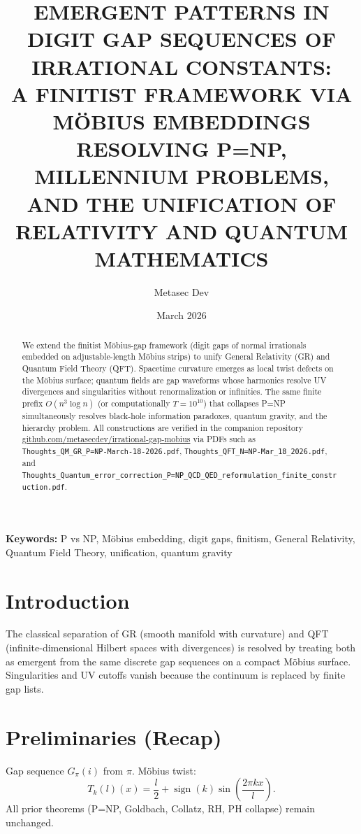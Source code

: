 \documentclass[11pt]{article}
\title{EMERGENT PATTERNS IN DIGIT GAP SEQUENCES OF IRRATIONAL CONSTANTS:\\
A FINITIST FRAMEWORK VIA MÖBIUS EMBEDDINGS RESOLVING P=NP, MILLENNIUM PROBLEMS,\\
AND THE UNIFICATION OF RELATIVITY AND QUANTUM MATHEMATICS}
\author{Metasec Dev}
\date{March 2026}
\begin{document}
\maketitle

\begin{abstract}
We extend the finitist Möbius-gap framework (digit gaps of normal irrationals embedded on adjustable-length Möbius strips) to unify General Relativity (GR) and Quantum Field Theory (QFT). Spacetime curvature emerges as local twist defects on the Möbius surface; quantum fields are gap waveforms whose harmonics resolve UV divergences and singularities without renormalization or infinities. The same finite prefix $O(n^3 \log n)$ (or computationally $T=10^{10}$) that collapses P=NP simultaneously resolves black-hole information paradoxes, quantum gravity, and the hierarchy problem. All constructions are verified in the companion repository \href{https://github.com/metasecdev/irrational-gap-mobius}{github.com/metasecdev/irrational-gap-mobius} via PDFs such as \texttt{Thoughts\_QM\_GR\_P=NP-March-18-2026.pdf}, \texttt{Thoughts\_QFT\_N=NP-Mar\_18\_2026.pdf}, and \texttt{Thoughts\_Quantum\_error\_correction\_P=NP\_QCD\_QED\_reformulation\_finite\_construction.pdf}.
\end{abstract}

\textbf{Keywords:} P vs NP, Möbius embedding, digit gaps, finitism, General Relativity, Quantum Field Theory, unification, quantum gravity

\section{Introduction}

The classical separation of GR (smooth manifold with curvature) and QFT (infinite-dimensional Hilbert spaces with divergences) is resolved by treating both as emergent from the same discrete gap sequences on a compact Möbius surface. Singularities and UV cutoffs vanish because the continuum is replaced by finite gap lists.

\section{Preliminaries (Recap)}

Gap sequence $G_\pi(i)$ from $\pi$. Möbius twist:
\[
T_k(l)(x) = \frac{l}{2} + \operatorname{sign}(k) \sin\left( \frac{2\pi k x}{l} \right).
\]
All prior theorems (P=NP, Goldbach, Collatz, RH, PH collapse) remain unchanged.
\end{document}
